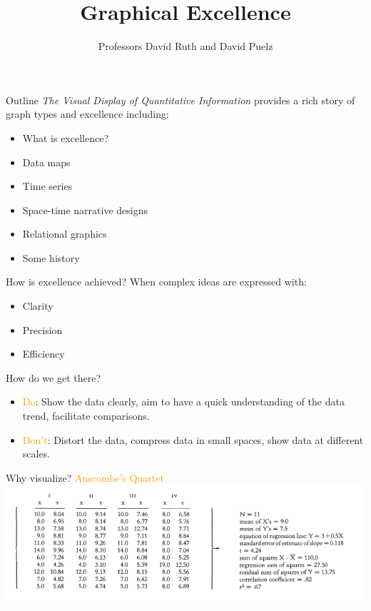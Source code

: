 \documentclass[
  ignorenonframetext,
]{beamer}
\title{Graphical Excellence}
\author{Professors David Ruth and David Puelz}
\date{}
\institute{The University of Austin}
\begin{document}
\frame{\titlepage}

\begin{frame}{Outline}
\protect\hypertarget{outline}{}
\emph{The Visual Display of Quantitative Information} provides a rich
story of graph types and excellence including:

\begin{itemize}
\item
  What is excellence?
\item
  Data maps
\item
  Time series
\item
  Space-time narrative designs
\item
  Relational graphics
\item
  Some history
\end{itemize}
\end{frame}

\begin{frame}{How is excellence achieved?}
\protect\hypertarget{how-is-excellence-achieved}{}
When complex ideas are expressed with:

\begin{itemize}
\item
  Clarity
\item
  Precision
\item
  Efficiency
\end{itemize}

\vspace{4mm}
\pause

How do we get there?

\begin{itemize}
\item
  \textcolor{orange}{Do}: Show the data clearly, aim to have a quick
  understanding of the data trend, facilitate comparisons.
\item
  \textcolor{orange}{Don't}: Distort the data, compress data in small
  spaces, show data at different scales.
\end{itemize}
\end{frame}

\begin{frame}{Why visualize? \textcolor{orange}{Anscombe's Quartet}}
\protect\hypertarget{why-visualize}{}
\includegraphics{excellence_figs/fig_1.png}
\end{frame}
\end{document}
